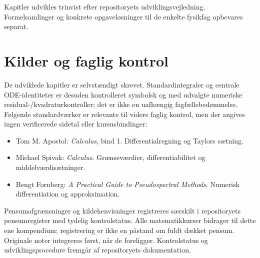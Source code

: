 \documentclass[11pt,a4paper,oneside]{book}
\begin{document}
Kapitler udvikles trinvist efter repositoryets udviklingsvejledning. Formelsamlinger og konkrete opgaveløsninger til de enkelte fysikfag opbevares separat.
\begingroup\small
\tableofcontents
\endgroup
\mainmatter





















\backmatter
\chapter{Kilder og faglig kontrol}
De udviklede kapitler er selvstændigt skrevet. Standardintegraler og centrale ODE-identiteter er desuden kontrolleret symbolsk og med udvalgte numeriske residual-/kvadraturkontroller; det er ikke en uafhængig fagfællebedømmelse. Følgende standardværker er relevante til videre faglig kontrol, men der angives ingen verificerede sidetal eller kursusbindinger:
\begin{itemize}
\item Tom M. Apostol: \emph{Calculus}, bind 1. Differentialregning og Taylors sætning.
\item Michael Spivak: \emph{Calculus}. Grænseværdier, differentiabilitet og middelværdisætninger.
\item Bengt Fornberg: \emph{A Practical Guide to Pseudospectral Methods}. Numerisk differentiation og approksimation.
\end{itemize}
Pensumafgrænsninger og kildehenvisninger registreres særskilt i repositoryets pensumregister med tydelig kontrolstatus. Alle matematikkurser bidrager til dette ene kompendium; registrering er ikke en påstand om fuldt dækket pensum. Originale noter integreres først, når de foreligger. Kontrolstatus og udviklingsprocedure fremgår af repositoryets dokumentation.
\end{document}
